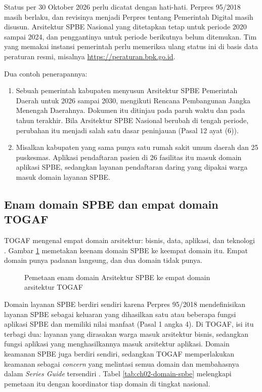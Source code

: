 Status per 30 Oktober 2026 perlu dicatat dengan hati-hati. Perpres 95/2018
masih berlaku, dan revisinya menjadi Perpres tentang Pemerintah Digital masih
disusun. Arsitektur SPBE Nasional yang ditetapkan tetap untuk periode 2020
sampai 2024, dan penggantinya untuk periode berikutnya belum ditemukan. Tim
yang memakai instansi pemerintah perlu memeriksa ulang status ini di basis
data peraturan resmi, misalnya \url{https://peraturan.bpk.go.id}.

Dua contoh penerapannya:

\begin{enumerate}
  \item Sebuah pemerintah kabupaten menyusun Arsitektur SPBE Pemerintah
        Daerah untuk 2026 sampai 2030, mengikuti Rencana Pembangunan Jangka
        Menengah Daerahnya. Dokumen itu ditinjau pada paruh waktu dan pada
        tahun terakhir. Bila Arsitektur SPBE Nasional berubah di tengah
        periode, perubahan itu menjadi salah satu dasar peninjauan (Pasal 12
        ayat (6)).
  \item Misalkan kabupaten yang sama punya satu rumah sakit umum daerah dan
        25 puskesmas. Aplikasi pendaftaran pasien di 26 fasilitas itu masuk
        domain aplikasi SPBE, sedangkan layanan pendaftaran daring yang
        dipakai warga masuk domain layanan SPBE.
\end{enumerate}

\subsection*{Enam domain SPBE dan empat domain TOGAF}

TOGAF mengenal empat domain arsitektur: bisnis, data, aplikasi, dan
teknologi \cite{togaf10}. Gambar \ref{fig:ch02-domain-spbe-togaf} memetakan
keenam domain SPBE ke keempat domain itu. Empat domain punya padanan
langsung, dan dua domain tidak punya.

\begin{figure}[!htb]
  \centering
  
  \caption{Pemetaan enam domain Arsitektur SPBE ke empat domain arsitektur
           TOGAF}
  \label{fig:ch02-domain-spbe-togaf}
\end{figure}

Domain layanan SPBE berdiri sendiri karena Perpres 95/2018 mendefinisikan
layanan SPBE sebagai keluaran yang dihasilkan satu atau beberapa fungsi
aplikasi SPBE dan memiliki nilai manfaat (Pasal 1 angka 4). Di TOGAF, isi itu
terbagi dua: layanan yang dirasakan warga masuk arsitektur bisnis, sedangkan
fungsi aplikasi yang menghasilkannya masuk arsitektur aplikasi. Domain
keamanan SPBE juga berdiri sendiri, sedangkan TOGAF memperlakukan keamanan
sebagai \textit{concern} yang melintasi semua domain dan membahasnya dalam
\textit{Series Guide} tersendiri \cite{c02-togaf-pocket}. Tabel
\ref{tab:ch02-domain-spbe} melengkapi pemetaan itu dengan koordinator tiap
domain di tingkat nasional.

